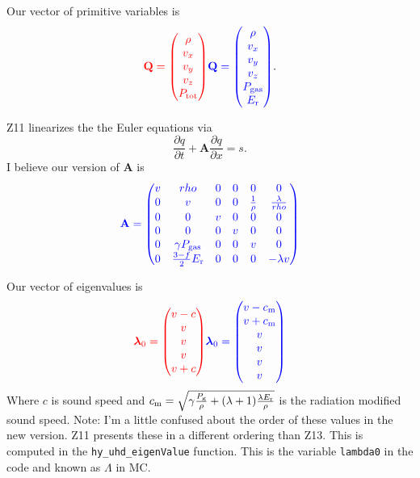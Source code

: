 \documentclass[preprint,11pt]{aastex}
\newcommand{\beq}{\begin{equation}}
\newcommand{\eeq}{\end{equation}}
\begin{document}
Our vector of primitive variables is
\beq
{\color{red}\mathbf{Q} = \begin{pmatrix}\rho\\v_x \\ v_y \\ v_z \\ P_{\rm tot}\end{pmatrix}} {\color{blue}\mathbf{Q} = \begin{pmatrix}\rho\\v_x \\ v_y \\ v_z \\ P_{\rm gas} \\ E_{\rm r}\end{pmatrix}}.
\eeq

Z11 linearizes the the Euler equations via
\beq
\frac{\partial q}{\partial t} + \mathbf{A} \frac{\partial q}{\partial x} = s.
\eeq
I believe our version of $\mathbf{A}$ is
\beq
{
	\color{blue}
	\mathbf{A} = 
	\begin{pmatrix}
	v & rho & 0 & 0 & 0 & 0 \\
	0 & v & 0 & 0 & \frac{1}{\rho} & \frac{\lambda}{rho} \\
	0 & 0 & v & 0 & 0 & 0 \\
	0 & 0 & 0 & v & 0 & 0 \\
	0 & \gamma P_{\rm gas} & 0 & 0 & v & 0 \\
	0 & \frac{3-f}{2} E_{\rm r} & 0 & 0 & 0 & -\lambda v
	\end{pmatrix}
}
\eeq

Our vector of eigenvalues is
\beq
{\color{red}\boldsymbol{\lambda}_0 = \begin{pmatrix}v - c\\v \\ v \\ v \\ v + c\end{pmatrix}}{\color{blue}\boldsymbol{\lambda}_0 = \begin{pmatrix}v - c_{\rm m}\\v + c_{\rm m} \\v \\ v \\ v \\ v \end{pmatrix}}
\eeq
Where $c$ is sound speed and $c_{\rm m}=\sqrt{\gamma \frac{P_{\rm g}}{\rho} + (\lambda + 1)\frac{\lambda E_{\rm r}}{\rho}}$ is the radiation modified sound speed.  {\color{blue}Note: I'm a little confused about the order of these values in the new version.  Z11 presents these in a different ordering than Z13.}  This is computed in the \verb!hy_uhd_eigenValue! function.  This is the variable \verb!lambda0! in the code and known as $\Lambda$ in MC.
\end{document}

